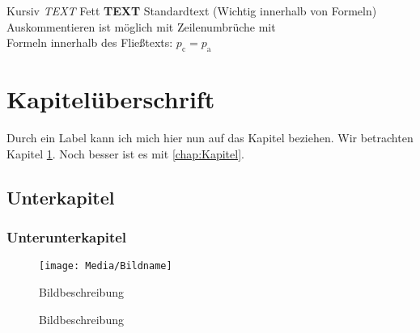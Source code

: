 %
%


Kursiv \textit{TEXT}
Fett \textbf{TEXT}
Standardtext  (Wichtig innerhalb von Formeln)
Auskommentieren ist möglich mit %
Zeilenumbrüche mit \\
Formeln innerhalb des Fließtexts: $p_\text{c} = p_\text{a}$


\chapter{Kapitelüberschrift}
\label{chap:Kapitel}
Durch ein Label kann ich mich hier nun auf das Kapitel beziehen. Wir betrachten Kapitel \ref{chap:Kapitel}. Noch besser ist es mit \autoref{chap:Kapitel}.

\section{Unterkapitel}
\label{sec:unterkapitel}

\subsection{Unterunterkapitel}
\label{subsec:unterunterkapitel}





\begin{figure}[]
{\centering
\texttt{[image: Media/Bildname]}
\caption{Bildbeschreibung}
\label{fig:Bild}
}
\end{figure}


\begin{figure}[H]
    \centering
    \hfill
    \hfill
    \caption{Bildbeschreibung}
    \label{fig:Bild3}
\end{figure}

